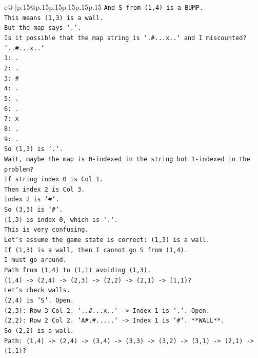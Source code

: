 \documentclass{article}
\begin{document}
{\begin{supertabular}{c@{$\;$}|p{.15\linewidth}@{}p{.15\linewidth}p{.15\linewidth}p{.15\linewidth}p{.15\linewidth}p{.15\linewidth}}
{{{\texttt{And S from (1,4) is a BUMP.} \\
\texttt{This means (1,3) is a wall.} \\
\texttt{But the map says `.`.} \\
\texttt{Is it possible that the map string is `.\#...x..` and I miscounted?} \\
\texttt{`..\#...x..`} \\
\texttt{1: .} \\
\texttt{2: .} \\
\texttt{3: \#} \\
\texttt{4: .} \\
\texttt{5: .} \\
\texttt{6: .} \\
\texttt{7: x} \\
\texttt{8: .} \\
\texttt{9: .} \\
\texttt{So (1,3) is `.`.} \\
\texttt{Wait, maybe the map is 0{-}indexed in the string but 1{-}indexed in the problem?} \\
\texttt{If string index 0 is Col 1.} \\
\texttt{Then index 2 is Col 3.} \\
\texttt{Index 2 is `\#`.} \\
\texttt{So (3,3) is `\#`.} \\
\texttt{(1,3) is index 0, which is `.`.} \\
\texttt{This is very confusing.} \\
\texttt{Let's assume the game state is correct: (1,3) is a wall.} \\
\texttt{If (1,3) is a wall, then I cannot go S from (1,4).} \\
\texttt{I must go around.} \\
\texttt{Path from (1,4) to (1,1) avoiding (1,3).} \\
\texttt{(1,4) {-}> (2,4) {-}> (2,3) {-}> (2,2) {-}> (2,1) {-}> (1,1)?} \\
\texttt{Let's check walls.} \\
\texttt{(2,4) is 'S'. Open.} \\
\texttt{(2,3): Row 3 Col 2. `..\#...x..` {-}> Index 1 is `.`. Open.} \\
\texttt{(2,2): Row 2 Col 2. `A\#.\#.....` {-}> Index 1 is `\#`. **WALL**.} \\
\texttt{So (2,2) is a wall.} \\
\texttt{Path: (1,4) {-}> (2,4) {-}> (3,4) {-}> (3,3) {-}> (3,2) {-}> (3,1) {-}> (2,1) {-}> (1,1)?} \\
}}}
\end{supertabular}}
\end{document}
